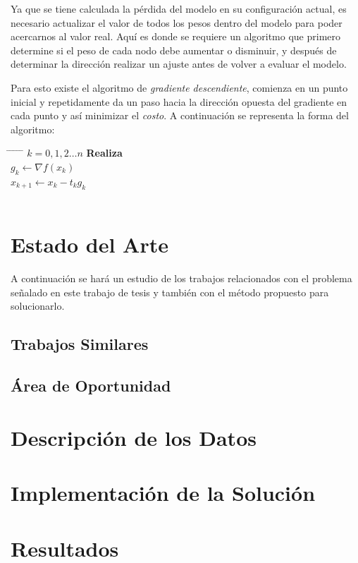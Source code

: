 Ya que se tiene calculada la pérdida del modelo en su configuración actual, es necesario actualizar el valor de todos los pesos dentro del modelo para poder acercarnos al valor real. Aquí es donde se requiere un algoritmo que primero determine si el peso de cada nodo debe aumentar o disminuir, y después de determinar la dirección realizar un ajuste antes de volver a evaluar el modelo.

Para esto existe el algoritmo de \emph{gradiente descendiente}, comienza en un punto inicial y repetidamente da un paso hacia la dirección opuesta del gradiente en cada punto y así minimizar el \emph{costo}. A continuación se representa la forma del algoritmo:

\begin{tabbing}
    \hspace*{1.5in} \= \hspace*{0.7in} \= \hspace*{.25in} \= \hspace*{.25in} \= \hspace*{.25in} \=\kill
     $k=0,1,2 \dots n$ {\bf Realiza } \\
    \>\> $g_k \leftarrow \nabla f(x_k)$ \\
    \>\> $x_{k+1} \leftarrow x_k - t_k g_k$ \\
     \\
\end{tabbing}


\chapter{Estado del Arte}
A continuación se hará un estudio de los trabajos relacionados con el problema señalado en este trabajo de tesis y también con el método propuesto para solucionarlo.

\section{Trabajos Similares}

\section{Área de Oportunidad}


\chapter{Descripción de los Datos}

\chapter{Implementación de la Solución}

\chapter{Resultados}

